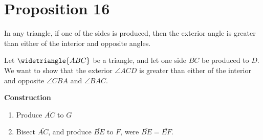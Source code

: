 \section*{Proposition 16}

\begin{thm}
In any triangle, if one of the sides is produced, then the exterior angle is greater than either of the interior and opposite angles.
\end{thm}


Let $\widetriangle{ABC}$ be a triangle, and let one side $\overline{BC}$ be produced to $D$. We want to show that the exterior $\angle{ACD}$ is greater than either of the interior and opposite $\angle{CBA}$ and $\angle{BAC}$.


\textbf{Construction}

\begin{enumerate}

\begin{figure}[H]
	\caption{}
\end{figure}

\item Produce $\overline{AC}$ to $G$

\begin{figure}[H]
	\caption{}
\end{figure}

\clearpage

\item Bisect $\overline{AC}$, and produce $\overline{BE}$ to $F$, were $\overline{BE} =\overline{EF}$.

\begin{figure}[H]
	\caption{}
\end{figure}


\end{enumerate}
